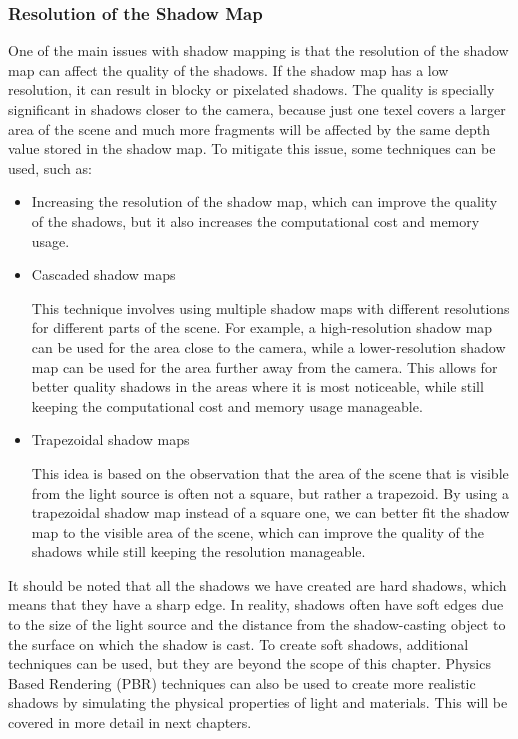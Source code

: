 \subsubsection{Resolution of the Shadow Map}

One of the main issues with shadow mapping is that the resolution of the shadow map can affect the quality of the shadows. If the shadow map has a low resolution, it can result in blocky or pixelated shadows. The quality is specially significant in shadows closer to the camera, because just one texel covers a larger area of the scene and much more fragments will be affected by the same depth value stored in the shadow map. To mitigate this issue, some techniques can be used, such as:
\begin{itemize}
    \item Increasing the resolution of the shadow map, which can improve the quality of the shadows, but it also increases the computational cost and memory usage.
    \item Cascaded shadow maps
    
    This technique involves using multiple shadow maps with different resolutions for different parts of the scene. For example, a high-resolution shadow map can be used for the area close to the camera, while a lower-resolution shadow map can be used for the area further away from the camera. This allows for better quality shadows in the areas where it is most noticeable, while still keeping the computational cost and memory usage manageable.

    \item Trapezoidal shadow maps
    
    This idea is based on the observation that the area of the scene that is visible from the light source is often not a square, but rather a trapezoid. By using a trapezoidal shadow map instead of a square one, we can better fit the shadow map to the visible area of the scene, which can improve the quality of the shadows while still keeping the resolution manageable.
\end{itemize}

It should be noted that all the shadows we have created are hard shadows, which means that they have a sharp edge. In reality, shadows often have soft edges due to the size of the light source and the distance from the shadow-casting object to the surface on which the shadow is cast. To create soft shadows, additional techniques can be used, but they are beyond the scope of this chapter. Physics Based Rendering (PBR) techniques can also be used to create more realistic shadows by simulating the physical properties of light and materials. This will be covered in more detail in next chapters.
    

